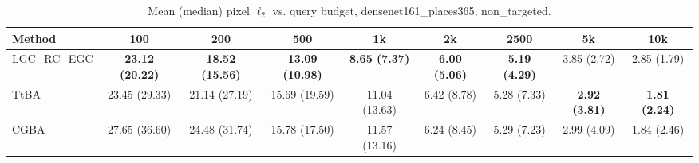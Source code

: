 \begin{table}[t]
\centering\footnotesize
\caption{Mean (median) pixel $\ell_2$ vs. query budget, densenet161\_places365, non\_targeted.}
\begin{tabular}{lcccccccc}
\toprule
Method & 100 & 200 & 500 & 1k & 2k & 2500 & 5k & 10k \\
\midrule
LGC\_RC\_EGC & \textbf{23.12 (20.22)} & \textbf{18.52 (15.56)} & \textbf{13.09 (10.98)} & \textbf{8.65 (7.37)} & \textbf{6.00 (5.06)} & \textbf{5.19 (4.29)} & 3.85 (2.72) & 2.85 (1.79) \\
TtBA & 23.45 (29.33) & 21.14 (27.19) & 15.69 (19.59) & 11.04 (13.63) & 6.42 (8.78) & 5.28 (7.33) & \textbf{2.92 (3.81)} & \textbf{1.81 (2.24)} \\
CGBA & 27.65 (36.60) & 24.48 (31.74) & 15.78 (17.50) & 11.57 (13.16) & 6.24 (8.45) & 5.29 (7.23) & 2.99 (4.09) & 1.84 (2.46) \\
\bottomrule
\end{tabular}
\end{table}
